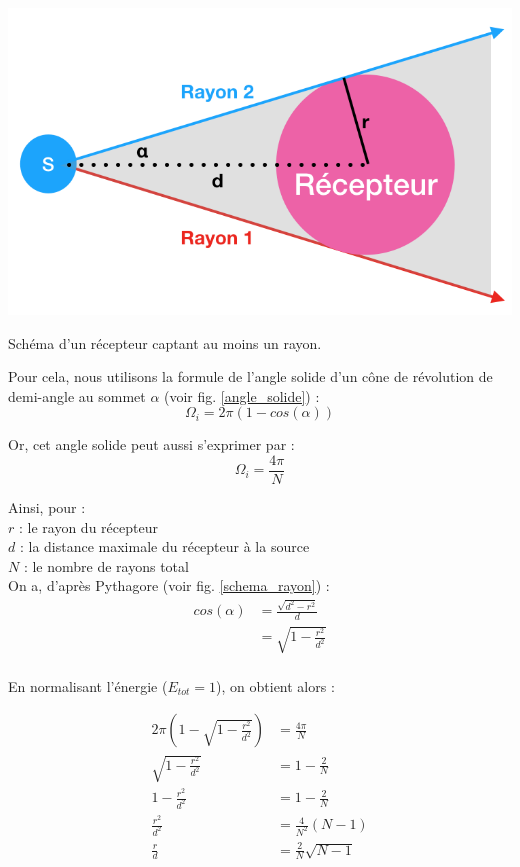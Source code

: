 \begin{figureth}
	\includegraphics[width=0.7\linewidth]{images/schema_rayon}
	\caption{Schéma d'un récepteur captant au moins un rayon.}
	\label{schema_rayon}
\end{figureth}

Pour cela, nous utilisons la formule de l'angle solide d'un cône de révolution \cite[Angle solide d'un cône de révolution]{cone} de demi-angle au sommet $\alpha$ (voir fig. \ref{angle_solide}) :
\begin{equation}
	\Omega_i = 2\pi(1-cos(\alpha))
\end{equation}


Or, cet angle solide peut aussi s'exprimer par :
\begin{equation}
	\Omega_i = \frac{4\pi}{N}
\end{equation}


Ainsi, pour : \\
$r$ : le rayon du récepteur \\
$d$ : la distance maximale du récepteur à la source \\
$N$ : le nombre de rayons total \\

On a, d'après Pythagore (voir fig. \ref{schema_rayon}) :
\begin{align}
	cos(\alpha) & =  \frac{\sqrt{d^2-r^2}}{d}  \\
	& =  \sqrt{1-\frac{r^2}{d^2}} \\
\end{align}

En normalisant l'énergie ($E_{tot} = 1$), on obtient alors :

\begin{align} 
	2\pi(1-\sqrt{1-\frac{r^2}{d^2}}) &= \frac{4\pi}{N} \\	
	\sqrt{1-\frac{r^2}{d^2}} &= 1-\frac{2}{N} \\
	1-\frac{r^2}{d^2} &= 1-\frac{2}{N} \\
	\frac{r^2}{d^2} &= \frac{4}{N^2}(N-1) \\
	 \frac{r}{d} &=  \frac{2}{N} \sqrt{N-1} \label{seuil_arret}
\end{align}


